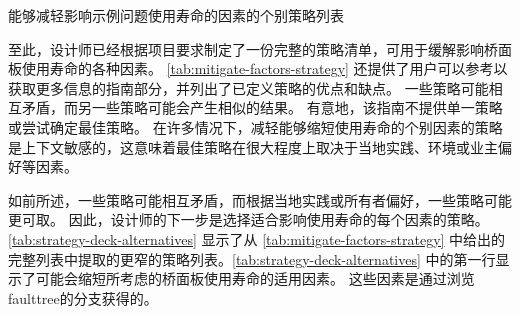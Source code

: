 \begin{table}
  \caption{能够减轻影响示例问题使用寿命的因素的个别策略列表}\label{tab:mitigate-factors-strategy}
\end{table}

至此，设计师已经根据项目要求制定了一份完整的策略清单，可用于缓解影响桥面板使用寿命的各种因素。 \cref{tab:mitigate-factors-strategy} 还提供了用户可以参考以获取更多信息的指南部分，并列出了已定义策略的优点和缺点。 一些策略可能相互矛盾，而另一些策略可能会产生相似的结果。 有意地，该指南不提供单一策略或尝试确定最佳策略。 在许多情况下，减轻能够缩短使用寿命的个别因素的策略是上下文敏感的，这意味着最佳策略在很大程度上取决于当地实践、环境或业主偏好等因素。

如前所述，一些策略可能相互矛盾，而根据当地实践或所有者偏好，一些策略可能更可取。 因此，设计师的下一步是选择适合影响使用寿命的每个因素的策略。\cref{tab:strategy-deck-alternatives} 显示了从 \cref{tab:mitigate-factors-strategy} 中给出的完整列表中提取的更窄的策略列表。\cref{tab:strategy-deck-alternatives} 中的第一行显示了可能会缩短所考虑的桥面板使用寿命的适用因素。 这些因素是通过浏览\gls*{faulttree}的分支获得的。

